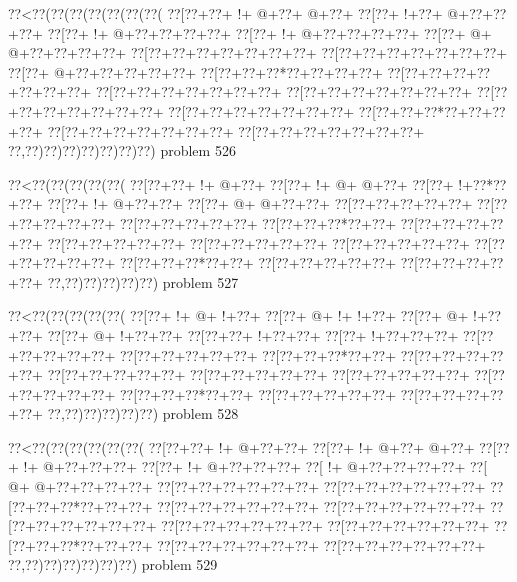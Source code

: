 \vbox{\vbox{\goo
\0??<\0??(\0??(\0??(\0??(\0??(\0??(\0??(
\0??[\0??+\0??+\- !+\- @+\0??+\- @+\0??+
\0??[\0??+\- !+\0??+\- @+\0??+\0??+\0??+
\0??[\0??+\- !+\- @+\0??+\0??+\0??+\0??+
\0??[\0??+\- !+\- @+\0??+\0??+\0??+\0??+
\0??[\0??+\- @+\- @+\0??+\0??+\0??+\0??+
\0??[\0??+\0??+\0??+\0??+\0??+\0??+\0??+
\0??[\0??+\0??+\0??+\0??+\0??+\0??+\0??+
\0??[\0??+\- @+\0??+\0??+\0??+\0??+\0??+
\0??[\0??+\0??+\0??*\0??+\0??+\0??+\0??+
\0??[\0??+\0??+\0??+\0??+\0??+\0??+\0??+
\0??[\0??+\0??+\0??+\0??+\0??+\0??+\0??+
\0??[\0??+\0??+\0??+\0??+\0??+\0??+\0??+
\0??[\0??+\0??+\0??+\0??+\0??+\0??+\0??+
\0??[\0??+\0??+\0??+\0??+\0??+\0??+\0??+
\0??[\0??+\0??+\0??*\0??+\0??+\0??+\0??+
\0??[\0??+\0??+\0??+\0??+\0??+\0??+\0??+
\0??[\0??+\0??+\0??+\0??+\0??+\0??+\0??+
\0??,\0??)\0??)\0??)\0??)\0??)\0??)\0??)
}
\hfil problem 526\hfil\break
}

\vbox{\vbox{\goo
\0??<\0??(\0??(\0??(\0??(\0??(
\0??[\0??+\0??+\- !+\- @+\0??+
\0??[\0??+\- !+\- @+\- @+\0??+
\0??[\0??+\- !+\0??*\0??+\0??+
\0??[\0??+\- !+\- @+\0??+\0??+
\0??[\0??+\- @+\- @+\0??+\0??+
\0??[\0??+\0??+\0??+\0??+\0??+
\0??[\0??+\0??+\0??+\0??+\0??+
\0??[\0??+\0??+\0??+\0??+\0??+
\0??[\0??+\0??+\0??*\0??+\0??+
\0??[\0??+\0??+\0??+\0??+\0??+
\0??[\0??+\0??+\0??+\0??+\0??+
\0??[\0??+\0??+\0??+\0??+\0??+
\0??[\0??+\0??+\0??+\0??+\0??+
\0??[\0??+\0??+\0??+\0??+\0??+
\0??[\0??+\0??+\0??*\0??+\0??+
\0??[\0??+\0??+\0??+\0??+\0??+
\0??[\0??+\0??+\0??+\0??+\0??+
\0??,\0??)\0??)\0??)\0??)\0??)
}
\hfil problem 527\hfil\break
}

\vbox{\vbox{\goo
\0??<\0??(\0??(\0??(\0??(\0??(
\0??[\0??+\- !+\- @+\- !+\0??+
\0??[\0??+\- @+\- !+\- !+\0??+
\0??[\0??+\- @+\- !+\0??+\0??+
\0??[\0??+\- @+\- !+\0??+\0??+
\0??[\0??+\0??+\- !+\0??+\0??+
\0??[\0??+\- !+\0??+\0??+\0??+
\0??[\0??+\0??+\0??+\0??+\0??+
\0??[\0??+\0??+\0??+\0??+\0??+
\0??[\0??+\0??+\0??*\0??+\0??+
\0??[\0??+\0??+\0??+\0??+\0??+
\0??[\0??+\0??+\0??+\0??+\0??+
\0??[\0??+\0??+\0??+\0??+\0??+
\0??[\0??+\0??+\0??+\0??+\0??+
\0??[\0??+\0??+\0??+\0??+\0??+
\0??[\0??+\0??+\0??*\0??+\0??+
\0??[\0??+\0??+\0??+\0??+\0??+
\0??[\0??+\0??+\0??+\0??+\0??+
\0??,\0??)\0??)\0??)\0??)\0??)
}
\hfil problem 528\hfil\break
}

\vbox{\vbox{\goo
\0??<\0??(\0??(\0??(\0??(\0??(\0??(
\0??[\0??+\0??+\- !+\- @+\0??+\0??+
\0??[\0??+\- !+\- @+\0??+\- @+\0??+
\0??[\0??+\- !+\- @+\0??+\0??+\0??+
\0??[\0??+\- !+\- @+\0??+\0??+\0??+
\0??[\- !+\- @+\0??+\0??+\0??+\0??+
\0??[\- @+\- @+\0??+\0??+\0??+\0??+
\0??[\0??+\0??+\0??+\0??+\0??+\0??+
\0??[\0??+\0??+\0??+\0??+\0??+\0??+
\0??[\0??+\0??+\0??*\0??+\0??+\0??+
\0??[\0??+\0??+\0??+\0??+\0??+\0??+
\0??[\0??+\0??+\0??+\0??+\0??+\0??+
\0??[\0??+\0??+\0??+\0??+\0??+\0??+
\0??[\0??+\0??+\0??+\0??+\0??+\0??+
\0??[\0??+\0??+\0??+\0??+\0??+\0??+
\0??[\0??+\0??+\0??*\0??+\0??+\0??+
\0??[\0??+\0??+\0??+\0??+\0??+\0??+
\0??[\0??+\0??+\0??+\0??+\0??+\0??+
\0??,\0??)\0??)\0??)\0??)\0??)\0??)
}
\hfil problem 529\hfil\break
}

